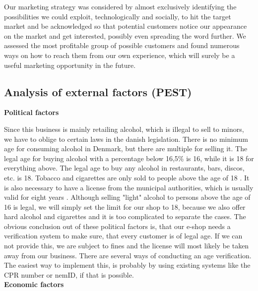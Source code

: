 \documentclass[12p]{article}
\begin{document}
Our marketing strategy was considered by almost exclusively identifying the possibilities we could exploit, technologically and socially, to hit the target market and be acknowledged so that potential customers notice our appearance on the market and get interested, possibly even spreading the word further. We assessed the most profitable group of possible customers and found numerous ways on how to reach them from our own experience, which will surely be a useful marketing opportunity in the future.

\newpage


\subsection{Analysis of external factors (PEST)} \label{PEST}

\textbf{Political factors}

Since this business is mainly retailing alcohol, which is illegal to sell to minors, we have to oblige to certain laws in the danish legislation. There is no minimum age for consuming alcohol in Denmark, but there are multiple for selling it. The legal age for buying alcohol with a percentage below 16,5\% is 16, while it is 18 for everything above. The legal age to buy any alcohol in restaurants, bars, discos, etc. is 18. Tobacco and cigarettes are only sold to people above the age of 18 \cite{PEST_AlcoholAndTobaccoLegalAge}. It is also necessary to have a license from the municipal authorities, which is usually valid for eight years \cite{PEST_DenmarkAlcoholLaws}. Although selling "light" alcohol to persons above the age of 16 is legal, we will simply set the limit for our shop to 18, because we also offer hard alcohol and cigarettes and it is too complicated to separate the cases. The obvious conclusion out of these political factors is, that our e-shop needs a verification system to make sure, that every customer is of legal age. If we can not provide this, we are subject to fines and the license will most likely be taken away from our business. There are several ways of conducting an age verification. The easiest way to implement this, is probably by using existing systems like the CPR number or nemID, if that is possible. \\

\textbf{Economic factors}
\end{document}
